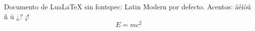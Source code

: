 \documentclass{article}
\begin{document}
Documento de LuaLaTeX sin fontspec: Latin Modern por defecto. Acentos: áéíóú ñ ü ¿? ¡!
\begin{equation} E = mc^2 \end{equation}
\end{document}
